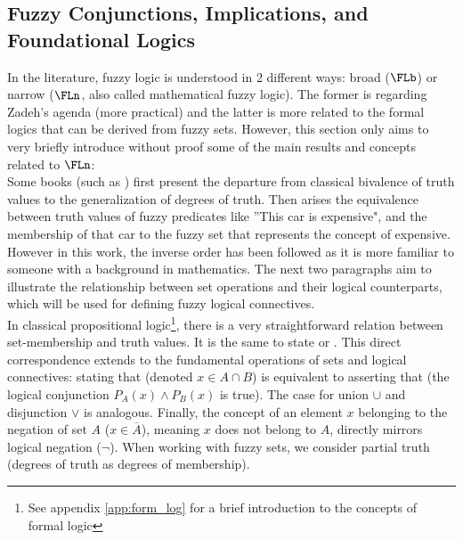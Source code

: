 
\subsection{Fuzzy Conjunctions, Implications, and Foundational Logics}

In the literature\cite{HistoryFL2017}, fuzzy logic is understood in 2 different ways: broad ($\FLb$) or narrow ($\FLn$, also called mathematical fuzzy logic). The former is regarding Zadeh's agenda (more practical) and the latter is more related to the formal logics that can be derived from fuzzy sets. However, this section only aims to very briefly introduce without proof some of the main results and concepts related to $\FLn$: \\

Some books (such as \cite{HistoryFL2017}) first present the departure from classical bivalence of truth values to the generalization of degrees of truth. Then arises the equivalence between truth values of fuzzy predicates like ''This car is expensive", and the membership of that car to the fuzzy set that represents the concept of expensive. However in this work, the inverse order has been followed as it is more familiar to someone with a background in mathematics. The next two paragraphs aim to illustrate the relationship between set operations and their logical counterparts, which will be used for defining fuzzy logical connectives.\\


In classical propositional logic\footnote{See appendix \ref{app:form_log} for a brief introduction to the concepts of formal logic}, there is a very straightforward relation between set-membership and truth values. It is the same to state  or . This direct correspondence extends to the fundamental operations of sets and logical connectives: stating that  (denoted $x \in A \cap B$) is equivalent to asserting that  (the logical conjunction $P_A(x) \land P_B(x)$ is true). The case for union $\cup$ and disjunction $\lor$ is analogous. Finally, the concept of an element $x$ belonging to the negation of set $A$ ($x \in \overline{A}$), meaning $x$ does not belong to $A$, directly mirrors logical negation ($\neg$). When working with fuzzy sets, we consider partial truth (degrees of truth as degrees of membership).\\

